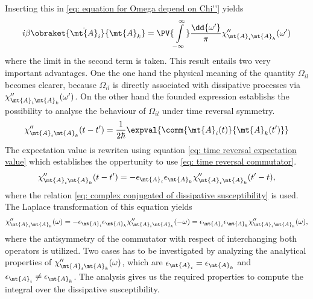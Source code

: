 %
Inserting this in \eqref{eq: equation for Omega depend on Chi''} yields
%
\begin{align}
	i \beta \obraket{\dot{\mt{A}}_{i}}{\mt{A}_{k}} = \PV{\int\limits_{-\infty}^{\infty}} \frac{\dd{\omega'}}{\pi} \chi''_{\mt{A}_{i} \mt{A}_{k}}(\omega')
	\label{eq: equation for Omega depend on Chi''}
\end{align}
%
where the limit in the second term is taken.
This result entails two very important advantages.
One the one hand the physical meaning of the quantity $\Omega_{il}$ becomes clearer, because $\Omega_{il}$ is directly associated with dissipative processes via $\chi''_{\mt{A}_{i} \mt{A}_{k}}(\omega')$.
On the other hand the founded expression establishs the possibility to analyse the behaviour of $\Omega_{il}$ under time reversal symmetry.
%
\begin{align}
	\chi''_{\mt{A}_{i} \mt{A}_{k}}(t-t') = \frac{1}{2\hbar} \expval{\comm{\mt{A}_{i}(t)}{\mt{A}_{k}(t')}}
\end{align}
% 
The expectation value is rewriten using equation \eqref{eq: time reversal expectation value} which establishes the oppertunity to use \eqref{eq: time reversal commutator}.
%
\begin{align}
	\chi''_{\mt{A}_{i} \mt{A}_{k}}(t-t') = -\epsilon_{\mt{A}_{i}} \epsilon_{\mt{A}_{k}} \chi''_{\mt{A}_{i} \mt{A}_{k}}(t'-t),
\end{align}
%
where the relation \eqref{eq: complex conjugated of dissipative susceptibility} is used.
The Laplace transformation of this equation yields
%
\begin{align}
	\chi''_{\mt{A}_{i} \mt{A}_{k}}(\omega) = -\epsilon_{\mt{A}_{i}} \epsilon_{\mt{A}_{k}} \chi''_{\mt{A}_{i} \mt{A}_{k}}(-\omega) = \epsilon_{\mt{A}_{i}} \epsilon_{\mt{A}_{k}} \chi''_{\mt{A}_{i} \mt{A}_{k}}(\omega),
\end{align}
%
where the antisymmetry of the commutator with respect of interchanging both operators is utilized.
Two cases has to be investigated by analyzing the analytical properties of $\chi''_{\mt{A}_{i} \mt{A}_{k}}(\omega)$, which are $\epsilon_{\mt{A}_{i}} = \epsilon_{\mt{A}_{k}}$ and $\epsilon_{\mt{A}_{i}} \neq \epsilon_{\mt{A}_{k}}$.
The analysis gives us the required properties to compute the integral over the dissipative susceptibility.
%
